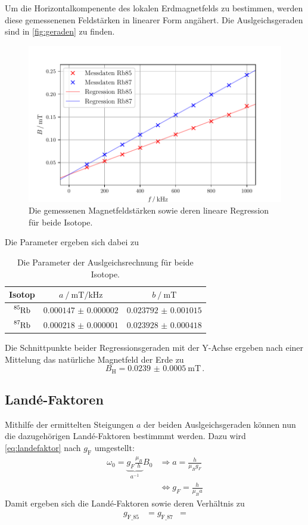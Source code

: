 Um die Horizontalkompenente des lokalen Erdmagnetfelds zu bestimmen,
werden diese gemessenenen Feldstärken in linearer Form angähert. 
Die Auslgeichsgeraden sind in \autoref{fig:geraden} zu finden.
\begin{figure}
    \centering
    \includegraphics[width = 0.8\linewidth]{build/geraden.pdf}
    \caption{Die gemessenen Magnetfeldstärken sowie deren lineare Regression für beide Isotope.}
    \label{fig:geraden}
\end{figure}
Die Parameter ergeben sich dabei zu 
\begin{table}
    \centering
    \caption{Die Parameter der Auslgeichsrechnung für beide Isotope.}
    \begin{tabular}{c c c}
        \toprule 
        Isotop &
        $a \mathbin{/} \unit{\milli\tesla\per\kilo\hertz}$ &
        $b \mathbin{/} \unit{\milli\tesla}$ \\
        \midrule
        $\ce{^{85}_{}Rb}$ & $\num{0.000147(2)}$ & $\num{0.023792(1015)}$ \\
        $\ce{^{87}_{}Rb}$ & $\num{0.000218(1)}$ & $\num{0.023928(418)}$ \\
        \bottomrule
    \end{tabular}
\end{table}

Die Schnittpunkte beider Regressionsgeraden mit der Y-Achse ergeben
nach einer Mittelung das natürliche Magnetfeld der Erde zu
\begin{equation*}
    B_\text{H} = \qty{0.0239(5)}{\milli\tesla} \, .
\end{equation*}


\subsection{Landé-Faktoren}

Mithilfe der ermittelten Steigungen $a$ der beiden Auslgeichsgeraden können nun
die dazugehörigen Landé-Faktoren bestimmmt werden.
Dazu wird \autoref{eq:landefaktor} nach $g_\text{F}$ umgestellt:
\begin{equation}
    \begin{aligned}
    \omega_0=\underbrace{g_F \frac{\mu_B}{h}}_{a^{-1}} B_0 & \Rightarrow a=\frac{h}{\mu_B g_F} \\
    & \Leftrightarrow g_F=\frac{h}{\mu_B a}
    \end{aligned}
\end{equation}
Damit ergeben sich die Landé-Faktoren sowie deren Verhältnis zu
\begin{align*}
    g_\text{F_85} &= \num{}
    g_\text{F_87} &= \num{} 
\end{align*}